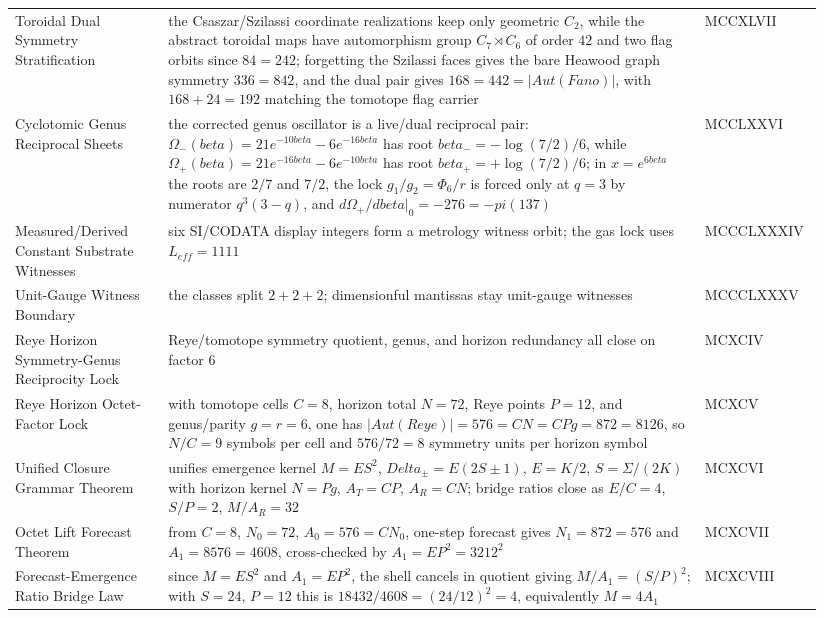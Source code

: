 \documentclass[11pt]{article}
\providecommand{\Kappa}{\mathrm{K}}
\def\mathrm#1{#1}%
\def\beta{beta}%
\def\Delta{Delta}%
\def\Phi#1{Phi#1}%
\def\pi{pi}%
\def\cdot{ }%
\begin{document}
{\begin{longtable}{>{\raggedright\arraybackslash}p{0.18\linewidth} >{\raggedright\arraybackslash}p{0.63\linewidth} >{\raggedright\arraybackslash}p{0.13\linewidth}}
Toroidal Dual Symmetry Stratification & the Csaszar/Szilassi coordinate realizations keep only geometric $C_2$, while the abstract toroidal maps have automorphism group $C_7\rtimes C_6$ of order $42$ and two flag orbits since $84=2\cdot42$; forgetting the Szilassi faces gives the bare Heawood graph symmetry $336=8\cdot42$, and the dual pair gives $168=4\cdot42=|\mathrm{Aut}(\mathrm{Fano})|$, with $168+24=192$ matching the tomotope flag carrier & MCCXLVII \\
Cyclotomic Genus Reciprocal Sheets & the corrected genus oscillator is a live/dual reciprocal pair: $\Omega_-(\beta)=21e^{-10\beta}-6e^{-16\beta}$ has root $\beta_-=-\log(7/2)/6$, while $\Omega_+(\beta)=21e^{-16\beta}-6e^{-10\beta}$ has root $\beta_+=+\log(7/2)/6$; in $x=e^{6\beta}$ the roots are $2/7$ and $7/2$, the lock $g_1/g_2=\Phi_6/r$ is forced only at $q=3$ by numerator $q^3(3-q)$, and $d\Omega_+/d\beta|_0=-276=-\pi(137)$ & MCCLXXVI \\
Measured/Derived Constant Substrate Witnesses & six SI/CODATA display integers form a metrology witness orbit; the gas lock uses $L_{\mathrm{eff}}=1111$ & MCCCLXXXIV \\
Unit-Gauge Witness Boundary & the classes split $2+2+2$; dimensionful mantissas stay unit-gauge witnesses & MCCCLXXXV \\
Reye Horizon Symmetry-Genus Reciprocity Lock & Reye/tomotope symmetry quotient, genus, and horizon redundancy all close on factor $6$ & MCXCIV \\
Reye Horizon Octet-Factor Lock & with tomotope cells $C=8$, horizon total $N=72$, Reye points $P=12$, and genus/parity $g=r=6$, one has $|\mathrm{Aut}(\mathrm{Reye})|=576=C\cdot N=C\cdot P\cdot g=8\cdot72=8\cdot12\cdot6$, so $N/C=9$ symbols per cell and $576/72=8$ symmetry units per horizon symbol & MCXCV \\
Unified Closure Grammar Theorem & unifies emergence kernel $M=E\cdot S^2$, $\Delta_{\pm}=E(2S\pm1)$, $E=\Kappa/2$, $S=\Sigma/(2\Kappa)$ with horizon kernel $N=P\cdot g$, $A_T=C\cdot P$, $A_R=C\cdot N$; bridge ratios close as $E/C=4$, $S/P=2$, $M/A_R=32$ & MCXCVI \\
Octet Lift Forecast Theorem & from $C=8$, $N_0=72$, $A_0=576=C\cdot N_0$, one-step forecast gives $N_1=8\cdot72=576$ and $A_1=8\cdot576=4608$, cross-checked by $A_1=E\cdot P^2=32\cdot12^2$ & MCXCVII \\
Forecast-Emergence Ratio Bridge Law & since $M=E\cdot S^2$ and $A_1=E\cdot P^2$, the shell cancels in quotient giving $M/A_1=(S/P)^2$; with $S=24$, $P=12$ this is $18432/4608=(24/12)^2=4$, equivalently $M=4A_1$ & MCXCVIII \\

\end{longtable}}
\end{document}
